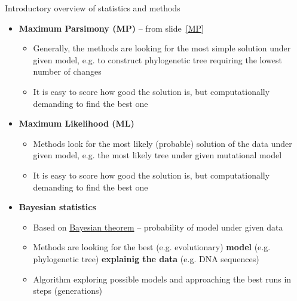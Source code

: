 \documentclass[compress, ucs, xelatex, 11pt, xcolor=svgnames,
  hyperref={
    bookmarks=true,
    unicode=true,
    colorlinks=true,
    pdftitle={Molecular data in R},
    plainpages=false,
    pdfauthor={Vojtech Zeisek},
    pdfsubject={Course about phylogeny and evolution in R},
    pdfcreator={XeLaTeX},
    pdfkeywords={R, evolution, phylogeny, molecular data},
    linkcolor=Tomato,
    anchorcolor=SaddleBrown,
    citecolor=Goldenrod,
    filecolor=DarkMagenta,
    menucolor=Sienna,
    urlcolor=DarkTurquoise,
    pdftex},
  url={hyphens, lowtilde} %
  ]{beamer}
\begin{document}
\begin{frame}[allowframebreaks]{Introductory overview of statistics and methods}
\begin{itemize}
\begin{itemize}
      \item Methods like Principal Component Analysis (\textbf{PCA}), Non-Metric Multidimensional Scaling (\textbf{NMDS}) or \textbf{PCoA} look for correlations between pairs of variables to reduce them into new variables -- after many steps new uncorrelated variables retaining maximum of original variability are constructed
      \item New variables are sorted according amount of variability they show (the decrease is very steep -- first 1-4~axes are usually enough) -- it is possible to display xy-scatter plot showing most of variability of the data
      \item Good for data display and creation of hypotheses -- not to verify them (there is no statistical test)
      \item Data are commonly scaled -- all variables are in same scale
    \end{itemize}
    \item \textbf{Maximum Parsimony (MP)} -- from slide~\ref{MP}
    \begin{itemize}
      \item Generally, the methods are looking for the most simple solution under given model, e.g. to construct phylogenetic tree requiring the lowest number of changes
      \item It is easy to score how good the solution is, but computationally demanding to find the best one
    \end{itemize}
    \item \textbf{Maximum Likelihood (ML)}
    \begin{itemize}
      \item Methods look for the most likely (probable) solution of the data under given model, e.g. the most likely tree under given mutational model
      \item It is easy to score how good the solution is, but computationally demanding to find the best one
    \end{itemize}
    \item \textbf{Bayesian statistics}
    \begin{itemize}
      \item Based on \href{https://en.wikipedia.org/wiki/Bayes_theorem}{Bayesian theorem} -- probability of model under given data
      \item Methods are looking for the best (e.g. evolutionary) \textbf{model} (e.g. phylogenetic tree) \textbf{explainig the data} (e.g. DNA sequences)
      \item Algorithm exploring possible models and approaching the best runs in steps (generations)

\end{itemize}
\end{itemize}
\end{frame}
\end{document}

